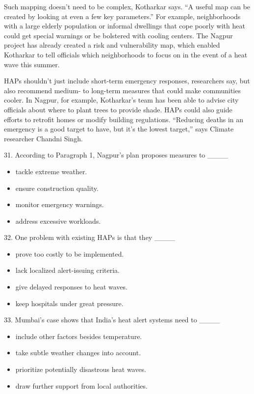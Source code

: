 \documentclass[UTF8,11pt]{ctexart}
\begin{document}
Such mapping doesn’t need to be complex, Kotharkar says. “A useful map can be created by looking at even a few key parameters.” For example, neighborhoods with a large elderly population or informal dwellings that cope poorly with heat could get special warnings or be bolstered with cooling centers. The Nagpur project has already created a risk and vulnerability map, which enabled Kotharkar to tell officials which neighborhoods to focus on in the event of a heat wave this summer.


HAPs shouldn’t just include short-term emergency responses, researchers say, but also recommend medium- to long-term measures that could make communities cooler. In Nagpur, for example, Kotharkar’s team has been able to advise city officials about where to plant trees to provide shade. HAPs could also guide efforts to retrofit homes or modify building regulations. “Reducing deaths in an emergency is a good target to have, but it’s the lowest target,” says Climate researcher Chandni Singh.


31. According to Paragraph 1, Nagpur’s plan proposes measures to \_\_\_\_


\begin{itemize}[leftmargin=2em,itemsep=.2em,topsep=.4em]\item[A.] tackle extreme weather.
\item[B.] ensure construction quality.
\item[C.] monitor emergency warnings.
\item[D.] address excessive workloads.
\end{itemize}

32. One problem with existing HAPs is that they \_\_\_\_


\begin{itemize}[leftmargin=2em,itemsep=.2em,topsep=.4em]\item[A.] prove too costly to be implemented.
\item[B.] lack localized alert-issuing criteria.
\item[C.] give delayed responses to heat waves.
\item[D.] keep hospitals under great pressure.
\end{itemize}

33. Mumbai’s case shows that India’s heat alert systems need to \_\_\_\_


\begin{itemize}[leftmargin=2em,itemsep=.2em,topsep=.4em]\item[A.] include other factors besides temperature.
\item[B.] take subtle weather changes into account.
\item[C.] prioritize potentially disastrous heat waves.
\item[D.] draw further support from local authorities.
\end{itemize}
\end{document}
